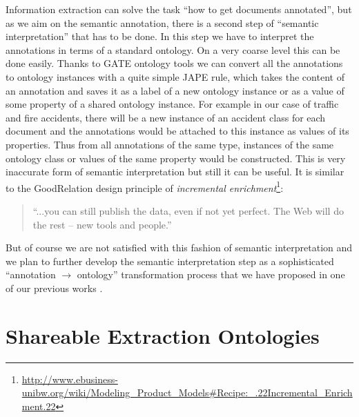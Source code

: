Information extraction can solve the task ``how to get documents annotated'', but as we aim on the semantic annotation, there is a second step of ``semantic interpretation'' that has to be done. In this step we have to interpret the annotations in terms of a standard ontology. On a very coarse level this can be done easily. Thanks to GATE ontology tools \citep{Bon04b} we can convert all the annotations to ontology instances with a quite simple JAPE \citep{Cunningham00jape:a} rule, which takes the content of an annotation and saves it as a label of a new ontology instance or as a value of some property of a shared ontology instance. For example in our case of traffic and fire accidents, there will be a new instance of an accident class for each document and the annotations would be attached to this instance as values of its properties. Thus from all annotations of the same type, instances of the same ontology class or values of the same property would be constructed. This is very inaccurate form of semantic interpretation but still it can be useful. It is similar to the GoodRelation \citep{DBLP:conf/ekaw/Hepp08} design principle of \emph{incremental enrichment}\footnote{\url{http://www.ebusiness-unibw.org/wiki/Modeling_Product_Models#Recipe:_.22Incremental_Enrichment.22}}:

\begin{quote}
``...you can still publish the data, even if not yet perfect. The Web will do the rest -- new tools and people.''	
\end{quote}

But of course we are not satisfied with this fashion of semantic interpretation and we plan to further develop the semantic interpretation step as a sophisticated ``annotation $\rightarrow$ ontology'' transformation process that we have proposed in one of our previous works \citep{biblio:DeVoComputingaggregations2008}.



\clearpage



\section{Shareable Extraction Ontologies} \label{sec:onto_extraction_ontologies}
\graphicspath{{../img/ch70/}}

